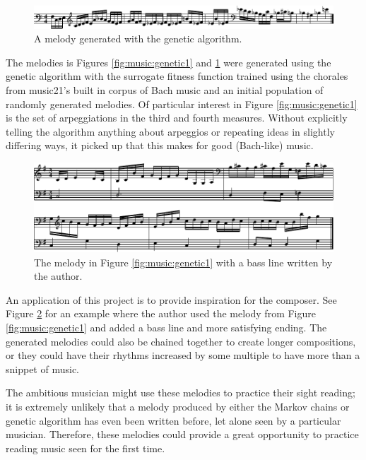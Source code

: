 \begin{figure}[h]
	\centering
	\includegraphics[width=\linewidth]{figures/genetic_melody_2.pdf}
	\caption{A melody generated with the genetic algorithm.}
	\label{fig:music:genetic2}
\end{figure}

The melodies is Figures \ref{fig:music:genetic1} and \ref{fig:music:genetic2} were generated using the genetic algorithm with the surrogate fitness function trained using the chorales from music21's built in corpus of Bach music and an initial population of randomly generated melodies.
Of particular interest in Figure \ref{fig:music:genetic1} is the set of arpeggiations in the third and fourth measures.
Without explicitly telling the algorithm anything about arpeggios or repeating ideas in slightly differing ways, it picked up that this makes for good (Bach-like) music.

\begin{figure}[h]
	\centering
	\includegraphics[width=\linewidth]{figures/genetic_melody_1_harmonized.pdf}
	\caption{The melody in Figure \ref{fig:music:genetic1} with a bass line written by the author.}
	\label{fig:music:geneticHarmonized}
\end{figure}

An application of this project is to provide inspiration for the composer.
See Figure \ref{fig:music:geneticHarmonized} for an example where the author used the melody from Figure \ref{fig:music:genetic1} and added a bass line and more satisfying ending.
The generated melodies could also be chained together to create longer compositions, or they could have their rhythms increased by some multiple to have more than a snippet of music.

The ambitious musician might use these melodies to practice their sight reading; it is extremely unlikely that a melody produced by either the Markov chains or genetic algorithm has even been written before, let alone seen by a particular musician.
Therefore, these melodies could provide a great opportunity to practice reading music seen for the first time.

